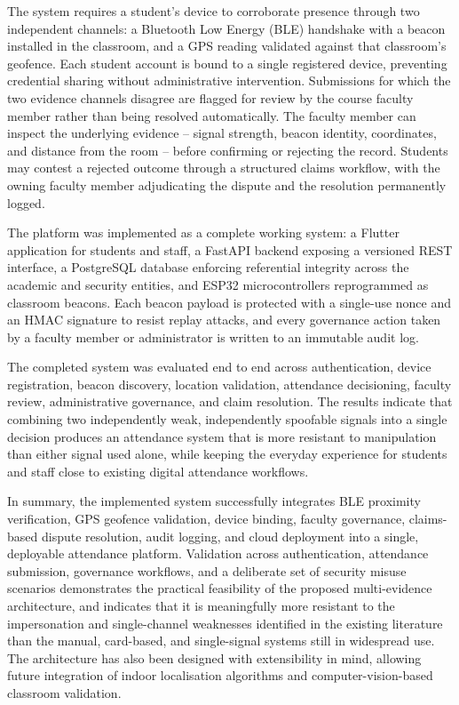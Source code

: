 \documentclass[12pt, a4paper, oneside]{report}
\begin{document}
The system requires a student's device to corroborate presence through two independent channels: a Bluetooth Low Energy (BLE) handshake with a beacon installed in the classroom, and a GPS reading validated against that classroom's geofence. Each student account is bound to a single registered device, preventing credential sharing without administrative intervention. Submissions for which the two evidence channels disagree are flagged for review by the course faculty member rather than being resolved automatically. The faculty member can inspect the underlying evidence -- signal strength, beacon identity, coordinates, and distance from the room -- before confirming or rejecting the record. Students may contest a rejected outcome through a structured claims workflow, with the owning faculty member adjudicating the dispute and the resolution permanently logged.

The platform was implemented as a complete working system: a Flutter application for students and staff, a FastAPI backend exposing a versioned REST interface, a PostgreSQL database enforcing referential integrity across the academic and security entities, and ESP32 microcontrollers reprogrammed as classroom beacons. Each beacon payload is protected with a single-use nonce and an HMAC signature to resist replay attacks, and every governance action taken by a faculty member or administrator is written to an immutable audit log.

The completed system was evaluated end to end across authentication, device registration, beacon discovery, location validation, attendance decisioning, faculty review, administrative governance, and claim resolution. The results indicate that combining two independently weak, independently spoofable signals into a single decision produces an attendance system that is more resistant to manipulation than either signal used alone, while keeping the everyday experience for students and staff close to existing digital attendance workflows.

In summary, the implemented system successfully integrates BLE proximity verification, GPS geofence validation, device binding, faculty governance, claims-based dispute resolution, audit logging, and cloud deployment into a single, deployable attendance platform. Validation across authentication, attendance submission, governance workflows, and a deliberate set of security misuse scenarios demonstrates the practical feasibility of the proposed multi-evidence architecture, and indicates that it is meaningfully more resistant to the impersonation and single-channel weaknesses identified in the existing literature than the manual, card-based, and single-signal systems still in widespread use. The architecture has also been designed with extensibility in mind, allowing future integration of indoor localisation algorithms and computer-vision-based classroom validation.
\end{document}
